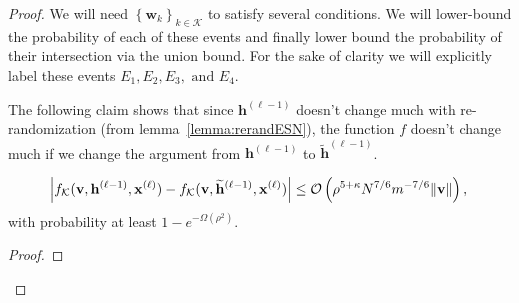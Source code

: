 \begin{proof}
	We will need $\left\{\mathbf{w}_{k}\right\}_{k \in \mathcal{K}}$ to satisfy several conditions. We will lower-bound the probability of each of these events and finally lower bound the probability of their intersection via the union bound. For the sake of clarity we will explicitly label these events $E_{1}, E_{2}, E_{3}, \text{ and } E_{4}$.
	
	
	
	The following claim shows that since $\mathbf{h}^{(\ell - 1)}$ doesn't change much with re-randomization (from lemma~\ref{lemma:rerandESN}), the function $f$ doesn't change much if we change the argument from $\mathbf{h}^{(\ell-1)}$ to $\widetilde{\mathbf{h}}^{(\ell - 1)}$. 
	
	\begin{claim}\label{claim:ff}
		\begin{equation*}
			\abs{f_{\mathcal{K}}(\mathbf{v}, \mathbf{h}^{(\ell-1)}, \mathbf{x}^{(\ell)}) - f_{\mathcal{K}}(\mathbf{v}, \widetilde{\mathbf{h}}^{(\ell-1)}, \mathbf{x}^{(\ell)}) } \le \mathcal{O}\left(\rho^{5 + \kappa} N^{7/6} m^{-7/6} \norm{\mathbf{v}} \right),
		\end{equation*}
		with probability at least $1 - e^{-\Omega(\rho^2)}$.
	\end{claim}
	
	\begin{proof}
		

\end{proof}
\end{proof}
